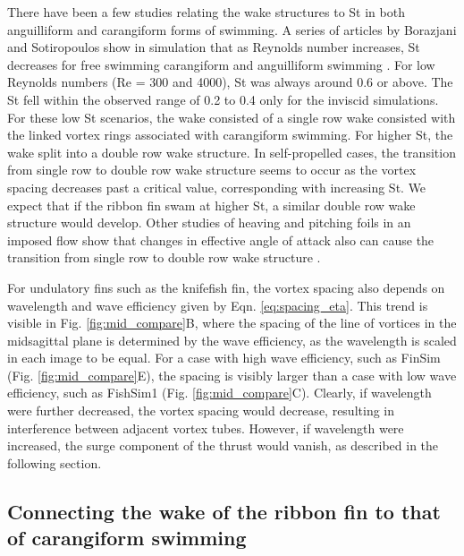 \documentclass[onecolumn]{IEEEtran}
\begin{document}
There have been a few studies relating the wake structures to St in both
anguilliform and carangiform forms of swimming. A series of articles by
Borazjani and Sotiropoulos show in simulation that as Reynolds number
increases, St decreases for free swimming carangiform and anguilliform
swimming \citep*{Bora08a,Bora09a}. For low Reynolds numbers (Re = 300 and
4000), St was always around 0.6 or above. The St fell within the observed
range of 0.2 to 0.4 only for the inviscid simulations. For these low St
scenarios, the wake consisted of a single row wake consisted with the
linked vortex rings associated with carangiform swimming. For higher St,
the wake split into a double row wake structure. In self-propelled cases,
the transition from single row to double row wake structure seems to occur
as the vortex spacing decreases past a critical value, corresponding with
increasing St. We expect that if the ribbon fin swam at higher St, a
similar double row wake structure would develop. Other studies of heaving
and pitching foils in an imposed flow show that changes in effective angle
of attack also can cause the transition from single row to double row wake
structure \citep*{Blon05a, Dewe12a}.

For undulatory fins such as the knifefish fin, the vortex spacing also
depends on wavelength and wave efficiency given by Eqn.
\ref{eq:spacing_eta}. This trend is visible in Fig. \ref{fig:mid_compare}B,
where the spacing of the line of vortices in the midsagittal plane is
determined by the wave efficiency, as the wavelength is scaled in each
image to be equal. For a case with high wave efficiency, such as FinSim
(Fig. \ref{fig:mid_compare}E), the spacing is visibly larger than a case
with low wave efficiency, such as FishSim1 (Fig. \ref{fig:mid_compare}C). 
Clearly, if wavelength were
further decreased, the vortex spacing would decrease, resulting in
interference between adjacent vortex tubes. However, if wavelength were
increased, the surge component of the thrust would vanish, as described in
the following section.


\subsection{Connecting the wake of the ribbon fin to that of carangiform swimming}
\end{document}
